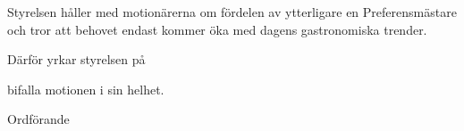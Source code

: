 \documentclass[../_main/handlingar.tex]{subfiles}
\begin{document}
\motionssvar

Styrelsen håller med motionärerna om fördelen av ytterligare en Preferensmästare och tror att behovet endast kommer öka med dagens gastronomiska trender.

Därför yrkar styrelsen på
\begin{attsatser}
    \att bifalla motionen i sin helhet.
\end{attsatser}

\begin{signatures}{1}
    \ist
    \signature{\ordf}{Ordförande}
\end{signatures}
\end{document}
